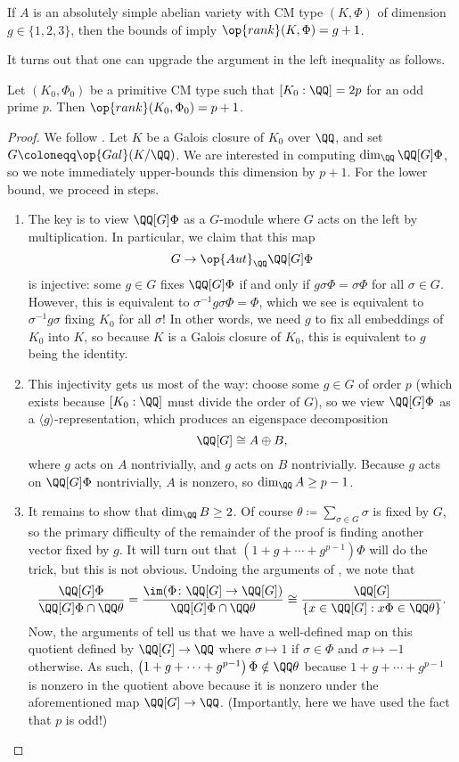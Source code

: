 \documentclass{article}
\begin{document}
\begin{example}
	If $A$ is an absolutely simple abelian variety with CM type $(K,\Phi)$ of dimension $g\in\{1,2,3\}$, then the bounds of  imply $\op{rank}(K,\Phi)=g+1$.
\end{example}
It turns out that one can upgrade the argument in the left inequality as follows.
\begin{proposition}
	Let $(K_0,\Phi_0)$ be a primitive CM type such that $[K_0:\QQ]=2p$ for an odd prime $p$. Then $\op{rank}(K_0,\Phi_0)=p+1$.
\end{proposition}
\begin{proof}
	We follow \cite[Theorem~2]{ribet-mt-av}. Let $K$ be a Galois closure of $K_0$ over $\QQ$, and set $G\coloneqq\op{Gal}(K/\QQ)$. We are interested in computing $\dim_\QQ\QQ[G]\Phi$, so we note  immediately upper-bounds this dimension by $p+1$. For the lower bound, we proceed in steps.
	\begin{enumerate}
		\item The key is to view $\QQ[G]\Phi$ as a $G$-module where $G$ acts on the left by multiplication. In particular, we claim that this map
		\[G\to\op{Aut}_\QQ\QQ[G]\Phi\]
		is injective: some $g\in G$ fixes $\QQ[G]\Phi$ if and only if $g\sigma\Phi=\sigma\Phi$ for all $\sigma\in G$. However, this is equivalent to $\sigma^{-1}g\sigma\Phi=\Phi$, which we see is equivalent to $\sigma^{-1}g\sigma$ fixing $K_0$ for all $\sigma$! In other words, we need $g$ to fix all embeddings of $K_0$ into $K$, so because $K$ is a Galois closure of $K_0$, this is equivalent to $g$ being the identity.

		\item This injectivity gets us most of the way: choose some $g\in G$ of order $p$ (which exists because $[K_0:\QQ]$ must divide the order of $G$), so we view $\QQ[G]\Phi$ as a $\langle g\rangle$-representation, which produces an eigenspace decomposition
		\[\QQ[G]\cong A\oplus B,\]
		where $g$ acts on $A$ nontrivially, and $g$ acts on $B$ nontrivially. Because $g$ acts on $\QQ[G]\Phi$ nontrivially, $A$ is nonzero, so $\dim_\QQ A\ge p-1$.

		\item It remains to show that $\dim_\QQ B\ge2$. Of course $\theta\coloneqq\sum_{\sigma\in G}\sigma$ is fixed by $G$, so the primary difficulty of the remainder of the proof is finding another vector fixed by $g$. It will turn out that $\left(1+g+\cdots+g^{p-1}\right)\Phi$ will do the trick, but this is not obvious. Undoing the arguments of , we note that
		\[\frac{\QQ[G]\Phi}{\QQ[G]\Phi\cap\QQ\theta}=\frac{\im(\Phi\colon\QQ[G]\to\QQ[G])}{\QQ[G]\Phi\cap\QQ\theta}\cong\frac{\QQ[G]}{\{x\in\QQ[G]:x\Phi\in\QQ\theta\}}.\]
		Now, the arguments of  tell us that we have a well-defined map on this quotient defined by $\QQ[G]\to\QQ$ where $\sigma\mapsto1$ if $\sigma\in\Phi$ and $\sigma\mapsto-1$ otherwise. As such, $\left(1+g+\cdots+g^{p-1}\right)\Phi\notin\QQ\theta$ because $1+g+\cdots+g^{p-1}$ is nonzero in the quotient above because it is nonzero under the aforementioned map $\QQ[G]\to\QQ$. (Importantly, here we have used the fact that $p$ is odd!)
		\qedhere
	\end{enumerate}
\end{proof}
\end{document}
